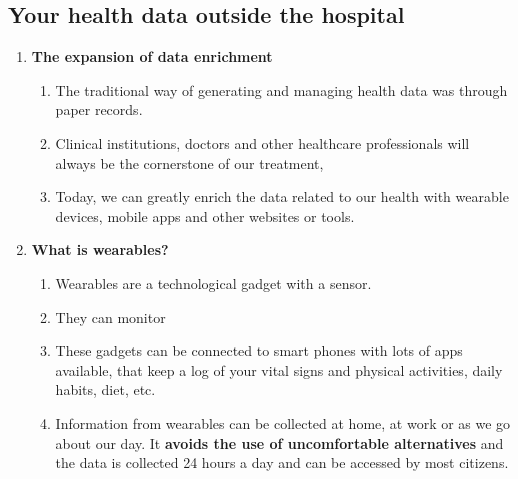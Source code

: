 \documentclass[10pt, twoside]{article}   	%
\begin{document}
\subsection{Your health data outside the hospital}
    \begin{enumerate}
        \item \textbf{The expansion of data enrichment }
            \begin{enumerate}
               \item The traditional way of generating and managing health data was through paper records.
               \item Clinical institutions, doctors and other healthcare professionals will always be the cornerstone of our treatment,                                  
                \item Today, we can greatly enrich the data related to our health with wearable devices, mobile apps and other websites or tools.
            \end{enumerate}   
        \item \textbf{What is wearables?} 
            \begin{enumerate}
               \item Wearables are a technological gadget with a sensor. 
               \item They can monitor 
               \item These gadgets can be connected to smart phones with lots of apps available, that keep a log of your vital signs and physical activities, daily habits, diet, etc.
               \item Information from wearables can be collected at home, at work or as we go about our day. It \textbf{avoids the use of uncomfortable alternatives} and the data is collected 24 hours a day and can be accessed by most citizens.
            \end{enumerate}   
    \end{enumerate}
\end{document}
